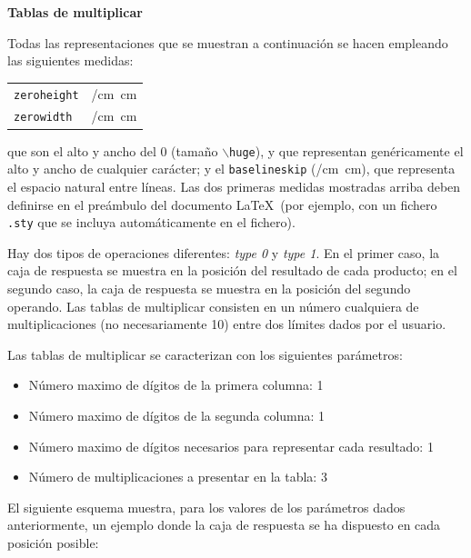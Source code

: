 \documentclass[svgnames,addpoints]{exam}
\makeatletter
\newlength{\zerowidth}
\newlength{\zeroheight}
\def\convertto#1#2{\strip@pt\dimexpr #2*65536/\number\dimexpr 1#1}
\makeatother
\begin{document}
{\Large\bf Tablas de multiplicar}

Todas las representaciones que se muestran a continuación se hacen
empleando las siguientes medidas:

\begin{center}
  \begin{tabular}{ll}
    \texttt{zeroheight}   & \convertto{cm}{\the\zeroheight}\ cm \\
    \texttt{zerowidth}    & \convertto{cm}{\the\zerowidth}\ cm \\
  \end{tabular}
\end{center}

\noindent
que son el alto y ancho del {\huge 0} (tamaño \texttt{$\backslash$huge}), y que
representan genéricamente el alto y ancho de cualquier carácter; y el
\texttt{baselineskip} (\convertto{cm}{\the\baselineskip}\ cm), que representa el
espacio natural entre líneas. Las dos primeras medidas mostradas arriba deben
definirse en el preámbulo del documento \LaTeX\ (por ejemplo, con un fichero
\texttt{.sty} que se incluya automáticamente en el fichero).

Hay dos tipos de operaciones diferentes: \textit{type 0} y \textit{type 1}. En
el primer caso, la caja de respuesta se muestra en la posición del resultado de
cada producto; en el segundo caso, la caja de respuesta se muestra en la
posición del segundo operando. Las tablas de multiplicar consisten en un número
cualquiera de multiplicaciones (no necesariamente 10) entre dos límites dados
por el usuario.

Las tablas de multiplicar se caracterizan con los siguientes parámetros:

\begin{itemize}

  \item Número maximo de dígitos de la primera columna: 1

  \item Número maximo de dígitos de la segunda columna: 1

  \item Número maximo de dígitos necesarios para representar cada resultado: 1

  \item Número de multiplicaciones a presentar en la tabla: 3

\end{itemize}

El siguiente esquema muestra, para los valores de los parámetros dados
anteriormente, un ejemplo donde la caja de respuesta se ha dispuesto en cada
posición posible:
\end{document}
